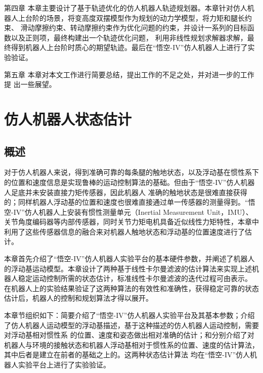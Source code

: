 第四章 本章主要设计了基于轨迹优化的仿人机器人轨迹规划器。本章针对仿人机器人上台阶的场景，将变高度双摆模型作为规划的动力学模型，将力矩和腿长约束、
滑动摩擦约束、转动摩擦约束作为优化问题的约束，并设计一系列的目标函数以及正则项，最终构建出一个轨迹优化问题，
利用非线性规划求解器求解，最终得到机器人上台阶时质心的期望轨迹。最后在“悟空-IV”仿人机器人上进行了实验验证。

第五章 本章对本文工作进行简要总结，提出工作的不足之处，并对进一步的工作提
出一些展望。
\chapter{仿人机器人状态估计}
\section{概述}
对于仿人机器人来说，得到准确可靠的每条腿的触地状态，以及浮动基在惯性系下的位置和速度信息是实现鲁棒的运动控制算法的基础。但由于“悟空-IV”仿人机器人足底并未安装直接力矩传感器，因此机器人
准确的触地状态是很难直接获得的；同样机器人浮动基的位置和速度也很难直接通过单一传感器的测量得到。“悟空-IV”仿人机器人上安装有惯性测量单元（Inertial Measurement Unit，IMU）、
关节角度编码器等内部传感器，同时关节力矩电机具备近似线性力矩特性，本章中利用了这些传感器信息的融合来对机器人触地状态和浮动基的位置速度进行了估计。

本章首先介绍了“悟空-IV”仿人机器人实验平台的基本硬件参数，并阐述了机器人的浮动基运动模型。本章设计了两种基于线性卡尔曼滤波的估计算法来实现上述机器人稳定运动控制所需的状态估计，标准线性卡尔曼滤波的迭代过程可由表示。
在机器人上的实验结果验证了这两种算法的有效性和准确性，获得稳定可靠的状态估计后，机器人的控制和规划算法才得以展开。

本章节组织如下：简要介绍了“悟空-IV”仿人机器人实验平台及其基本参数；介绍了仿人机器人运动模型的浮动基描述，基于这种描述的仿人机器人运动控制，需要对浮动基相对惯性系
的位置、速度和姿态做出相对准确的估计；和分别介绍了对机器人与环境的接触状态和机器人浮动基相对于惯性系的位置、速度的估计算法，其中后者是建立在前者的基础之上的。这两种状态估计算法
均在“悟空-IV”仿人机器人实验平台上进行了实验验证。
